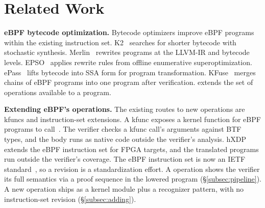 

\section{Related Work}
\label{sec:related}

\noindent\textbf{eBPF bytecode optimization.}
Bytecode optimizers improve eBPF programs within the existing instruction set.
K2~\cite{xu2021synthesizing} searches for shorter bytecode with stochastic synthesis.
Merlin~\cite{mao2024merlin} rewrites programs at the LLVM-IR and bytecode levels.
EPSO~\cite{zhu2025epso} applies rewrite rules from offline enumerative superoptimization.
ePass~\cite{xiang2025epass} lifts bytecode into SSA form for program transformation.
KFuse~\cite{kfuse} merges chains of eBPF programs into one program after verification.
\tool extends the set of operations available to a program.

\noindent\textbf{Extending eBPF's operations.}
The existing routes to new operations are kfuncs and instruction-set extensions.
A kfunc exposes a kernel function for eBPF programs to call~\cite{kfuncs}.
The verifier checks a kfunc call's arguments against BTF types, and the body runs as native code outside the verifier's analysis.
hXDP~\cite{brunella2020hxdp} extends the eBPF instruction set for FPGA targets, and the translated programs run outside the verifier's coverage.
The eBPF instruction set is now an IETF standard~\cite{rfc9669}, so a revision is a standardization effort.
A \tool operation shows the verifier its full semantics via a proof sequence in the lowered program (\S\ref{subsec:pipeline}).
A new operation ships as a kernel module plus a recognizer pattern, with no instruction-set revision (\S\ref{subsec:adding}).

